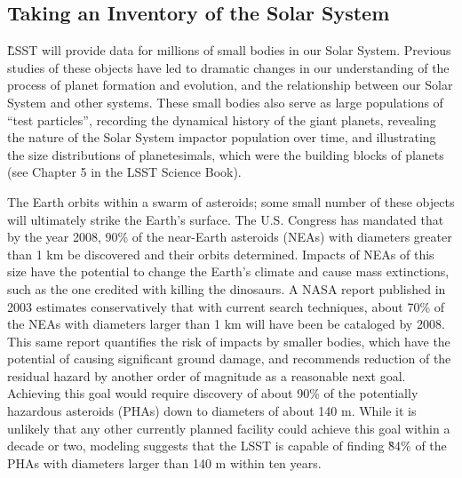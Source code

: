 \subsection{Taking an Inventory of the Solar System}

\G{LSST will provide data for millions of small bodies in our Solar System. Previous studies
of these objects have led to dramatic changes in our understanding of the process of
planet formation and evolution, and the relationship between our Solar System and other
systems. These small bodies also serve as large populations of ``test particles'', recording
the dynamical history of the giant planets, revealing the nature of the Solar System impactor
population over time, and illustrating the size distributions of planetesimals, which were the
building blocks of planets  (see Chapter 5 in the LSST Science Book).}

The Earth orbits within a swarm of asteroids; some small number of these
objects will ultimately strike the Earth's surface. The U.S. Congress has
mandated that by the year 2008, 90\% of the near-Earth asteroids (NEAs)
with diameters greater than 1 km be discovered and their orbits
determined. Impacts of NEAs of this size have the potential to change the
Earth's climate and cause mass extinctions, such as the one credited with
killing the dinosaurs. A NASA report published in 2003 estimates
conservatively that with current search techniques, about 70\% of the NEAs
with diameters larger than 1 km will have been be cataloged by 2008. This same report
quantifies the risk of impacts by smaller bodies, which have the potential
of causing significant ground damage, and recommends reduction of the residual
hazard by another order of magnitude  as a reasonable next
goal. Achieving this goal would require discovery of about 90\% of the
potentially hazardous asteroids (PHAs) down to diameters of about 140
m. While it is unlikely that any other currently planned facility could achieve
this goal within a decade or two, modeling suggests that the LSST is capable
of finding  \G{84\%} of the PHAs with diameters larger than 140 m within
ten years.

